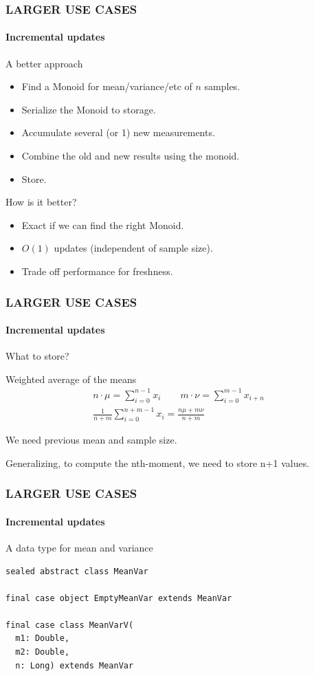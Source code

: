 \documentclass{beamer}
\begin{document}
\begin{frame} \frametitle{LARGER USE CASES}
  \framesubtitle{Incremental updates}
  \begin{block}{A better approach}
  \begin{itemize}
    \item Find a \alert{Monoid for mean/variance/etc} of \(n\) samples.
    \item Serialize the Monoid to storage.
    \item Accumulate several (or 1) new measurements.
    \item \alert{Combine} the old and new results using the monoid.
    \item Store.
  \end{itemize}
  \end{block}

  \pause

  \begin{block}{How is it better?}
  \begin{itemize}
    \item \alert{Exact} if we can find the right Monoid.
    \item \alert{\(O(1)\) updates} (independent of sample size).
    \item Trade off performance for freshness.
  \end{itemize}
  \end{block}

\end{frame}

\begin{frame} \frametitle{LARGER USE CASES}
  \framesubtitle{Incremental updates}
  What to store?
  \begin{block}{Weighted average of the means}
    \[
    \begin{split}
      n\cdot \mu = \sum_{i=0}^{n-1} x_i \qquad  m\cdot \nu = \sum_{i=0}^{m-1} x_{i+n} \\
      \frac{1}{n+m} \sum_{i=0}^{n+m-1} x_i = \frac{n\mu + m\nu} {n+m}
    \end{split}
    \]
  \end{block}

  We need previous \alert{mean} and \alert{sample size.}

  Generalizing, to compute the nth-moment, we need to store n+1 values.
\end{frame}

\begin{frame}[fragile] \frametitle{LARGER USE CASES}
  \framesubtitle{Incremental updates}
  \begin{block}{A data type for mean and variance}
  \begin{lstlisting}
sealed abstract class MeanVar

final case object EmptyMeanVar extends MeanVar

final case class MeanVarV(
  m1: Double,
  m2: Double,
  n: Long) extends MeanVar
  \end{lstlisting}
  \end{block}
\end{frame}
\end{document}
